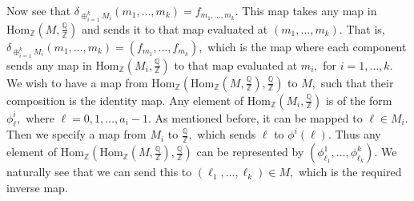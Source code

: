 \documentclass{article}
\begin{document}
\begin{enumerate}
	Now see that $\delta_{\oplus_{i=1}^k M_i}(m_1,\dots, m_k)=f_{m_1,\dots,m_k}.$ This map takes any map in 
	$\text{Hom}_{\mathbb{Z}}\left(M,\frac{\mathbb{Q}}{\mathbb{Z}}\right)$ and sends it to that map evaluated at $(m_1,\dots,m_k).$ That is, 
	$\delta_{\oplus_{i=1}^k M_i}(m_1,\dots,m_k)=(f_{m_1},\dots,f_{m_k}),$ which is the map where each component sends any map in 
	$\text{Hom}_{\mathbb{Z}}\left(M_i,\frac{\mathbb{Q}}{\mathbb{Z}}\right) $ to that map evaluated at $m_i,$ for $i=1,\dots, k.$ We wish to have a map from 
	$\text{Hom}_{\mathbb{Z}}\left(\text{Hom}_{\mathbb{Z}}\left(M,\frac{\mathbb{Q}}{\mathbb{Z}}\right),\frac{\mathbb{Q}}{\mathbb{Z}}\right)$ to $M,$ such 
	that their composition is the identity map. Any element of $\text{Hom}_{\mathbb{Z}}\left(M_i,\frac{\mathbb{Q}}{\mathbb{Z}}\right)$ is of the form 
	$\phi^i_{\ell},$ where $\ell= 0,1,\dots,a_i-1.$ As mentioned before, it can be mapped to $\ell \in M_i.$ Then we specify a map from $M_i$ to 
	$\frac{\mathbb{Q}}{\mathbb{Z}},$ which sends $\ell$ to $\phi^i(\ell).$ Thus any element of 
	$\text{Hom}_{\mathbb{Z}}\left(\text{Hom}_{\mathbb{Z}}\left(M,\frac{\mathbb{Q}}{\mathbb{Z}}\right),\frac{\mathbb{Q}}{\mathbb{Z}}\right)$ can be 
	represented by $(\phi^1_{\ell_1},\dots,\phi^k_{\ell_k}).$ We naturally see that we can send this to $(\ell_1,\dots,\ell_k) \in M,$ which is the required 
	inverse map.  
	 
\end{enumerate}
\end{document}
